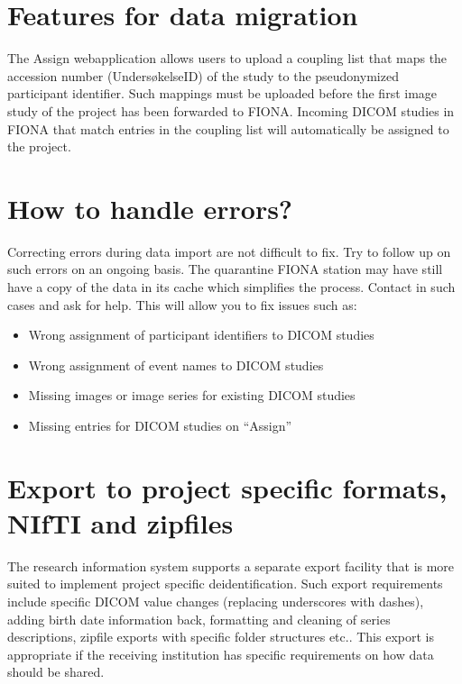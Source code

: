 \documentclass[letterpaper,10pt,english]{sphinxmanual}
\begin{document}
\section{Features for data migration}
\label{\detokenize{ServerAdmin/admin:features-for-data-migration}}
\sphinxAtStartPar
The Assign web\sphinxhyphen{}application allows users to upload a coupling list that maps the accession number (Undersøkelse\sphinxhyphen{}ID) of the study to the pseudonymized participant identifier. Such mappings must be uploaded before the first image study of the project has been forwarded to FIONA. Incoming DICOM studies in FIONA that match entries in the coupling list will automatically be assigned to the project.


\section{How to handle errors?}
\label{\detokenize{ServerAdmin/admin:how-to-handle-errors}}
\sphinxAtStartPar
Correcting errors during data import are not difficult to fix. Try to follow up on such errors on an ongoing basis. The quarantine FIONA station may have still have a copy of the data in its cache which simplifies the process. Contact  in such cases and ask for help. This will allow you to fix issues such as:
\begin{itemize}
\item {} 
\sphinxAtStartPar
Wrong assignment of participant identifiers to DICOM studies

\item {} 
\sphinxAtStartPar
Wrong assignment of event names to DICOM studies

\item {} 
\sphinxAtStartPar
Missing images or image series for existing DICOM studies

\item {} 
\sphinxAtStartPar
Missing entries for DICOM studies on “Assign”

\end{itemize}


\section{Export to project specific formats, NIfTI and zip\sphinxhyphen{}files}
\label{\detokenize{ServerAdmin/admin:export-to-project-specific-formats-nifti-and-zip-files}}
\sphinxAtStartPar
The research information system supports a separate export facility that is more suited to implement project specific de\sphinxhyphen{}identification. Such export requirements include specific DICOM value changes (replacing underscores with dashes), adding birth date information back, formatting and cleaning of series descriptions, zip\sphinxhyphen{}file exports with specific folder structures etc.. This export is appropriate if the receiving institution has specific requirements on how data should be shared.
\end{document}
